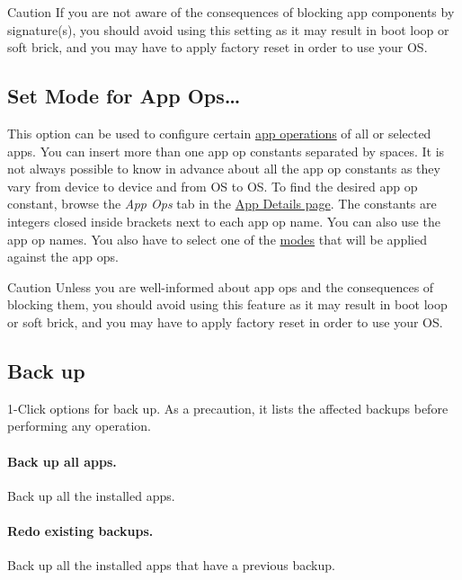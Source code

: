 \begin{danger}{Caution}
    If you are not aware of the consequences of blocking app components by signature(s), you should avoid using this
    setting as it may result in boot loop or soft brick, and you may have to apply factory reset in order to use your OS\@.
\end{danger}

\subsection{Set Mode for App Ops\dots}\label{subsec:set-mode-for-app-ops-dots} %
This option can be used to configure certain \hyperref[ch:app-ops]{app operations} of all or selected apps.
You can insert more than one app op constants separated by spaces.
It is not always possible to know in advance about all the app op constants as they vary from device to device and from OS to OS\@.
To find the desired app op constant, browse the \textit{App Ops} tab in the \hyperref[sec:app-details-page]{App Details page}.
The constants are integers closed inside brackets next to each app op name.
You can also use the app op names.
You also have to select one of the \hyperref[subsec:mode-constants]{modes} that will be applied against the app ops.

\begin{danger}{Caution}
    Unless you are well-informed about app ops and the consequences of blocking them, you should avoid using this
    feature as it may result in boot loop or soft brick, and you may have to apply factory reset in order to use your OS\@.
\end{danger}

\subsection{Back up}\label{subsec:1-click-back-up} %
1-Click options for back up.
As a precaution, it lists the affected backups before performing any operation.

\paragraph{Back up all apps.} Back up all the installed apps.

\paragraph{Redo existing backups.} Back up all the installed apps that have a previous backup.

